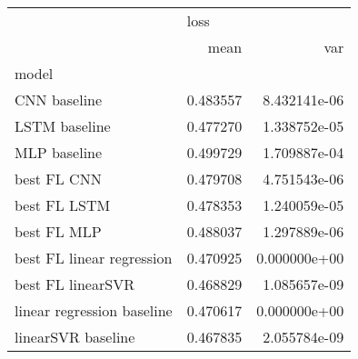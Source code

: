 \begin{tabular}{lrr}
\toprule
{} & \multicolumn{2}{l}{loss} \\
{} &      mean &           var \\
model                      &           &               \\
\midrule
CNN baseline               &  0.483557 &  8.432141e-06 \\
LSTM baseline              &  0.477270 &  1.338752e-05 \\
MLP baseline               &  0.499729 &  1.709887e-04 \\
best FL CNN                &  0.479708 &  4.751543e-06 \\
best FL LSTM               &  0.478353 &  1.240059e-05 \\
best FL MLP                &  0.488037 &  1.297889e-06 \\
best FL linear regression  &  0.470925 &  0.000000e+00 \\
best FL linearSVR          &  0.468829 &  1.085657e-09 \\
linear regression baseline &  0.470617 &  0.000000e+00 \\
linearSVR baseline         &  0.467835 &  2.055784e-09 \\
\bottomrule
\end{tabular}
